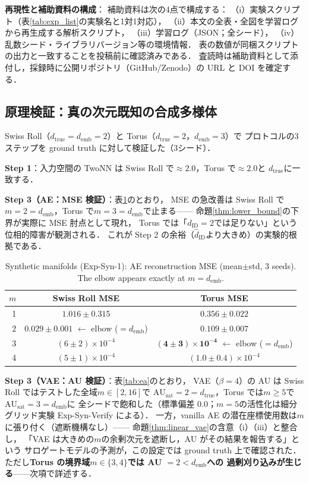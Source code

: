 \documentclass[11pt,a4paper]{jsarticle}
\newcommand{\dID}{d_{\mathrm{ID}}}
\newcommand{\hatdID}{\hat{d}_{\mathrm{ID}}}
\newcommand{\dtrue}{d_{\mathrm{true}}}
\newcommand{\AUsat}{\mathrm{AU}_{\mathrm{sat}}}
\newcommand{\demb}{d_{\mathrm{emb}}}
\begin{document}
\textbf{再現性と補助資料の構成}：
補助資料は次の4点で構成する：
（i）実験スクリプト（表\ref{tab:exp_list}の実験名と1対1対応），
（ii）本文の全表・全図を学習ログから再生成する解析スクリプト，
（iii）学習ログ（JSON；全シード），
（iv）乱数シード・ライブラリバージョン等の環境情報．
表の数値が同梱スクリプトの出力と一致することを投稿前に確認済みである．
査読時は補助資料として添付し，採録時に公開リポジトリ（GitHub/Zenodo）の
URL と DOI を確定する．

\subsection{原理検証：真の次元既知の合成多様体}\label{sec:exp_syn}

Swiss Roll（$\dtrue = \demb = 2$）と Torus（$\dtrue = 2$，$\demb = 3$）で
プロトコルの3ステップを ground truth に対して検証した（3シード）．

\textbf{Step 1}：入力空間の TwoNN は Swiss Roll で$\approx 2.0$，Torus で$\approx 2.0$と
$\dtrue$に一致する．

\textbf{Step 3（AE：MSE 検証）}：表\ref{tab:e1}のとおり，
MSE の急改善は Swiss Roll で$m = 2 = \demb$，Torus で$m = 3 = \demb$で止まる——
命題\ref{thm:lower_bound}の下界が実際に MSE 肘点として現れ，
Torus では「$\dID = 2$では足りない」という位相的障害が観測される．
これが Step 2 の余裕（$\hatdID$より大きめ）の実験的根拠である．

\begin{table}[H]
\centering
\caption{Synthetic manifolds (Exp-Syn-1): AE reconstruction MSE
(mean$\pm$std, 3 seeds). The elbow appears exactly at $m = \demb$.}
\label{tab:e1}
\small
\begin{tabular}{rcc}
\toprule
$m$ & Swiss Roll MSE & Torus MSE \\
\midrule
1 & $1.016 \pm 0.315$ & $0.356 \pm 0.022$ \\
2 & $\boldsymbol{0.029 \pm 0.001}$ $\leftarrow$ elbow ($= \demb$) & $0.109 \pm 0.007$ \\
3 & $(6 \pm 2) \times 10^{-4}$ & $\boldsymbol{(4 \pm 3) \times 10^{-4}}$ $\leftarrow$ elbow ($= \demb$) \\
4 & $(5 \pm 1) \times 10^{-4}$ & $(1.0 \pm 0.4) \times 10^{-4}$ \\
\bottomrule
\end{tabular}
\end{table}

\textbf{Step 3（VAE：AU 検証）}：表\ref{tab:ea}のとおり，
VAE（$\beta = 4$）の AU は Swiss Roll ではテストした全域$m \in [2, 16]$で
$\AUsat = 2 = \dtrue$，Torus では$m \geq 5$で$\AUsat = 3 = \demb$に
全シードで飽和した（標準偏差 0.0；$m = 5$の活性化は細分グリッド実験
Exp-Syn-Verify による）．
一方，vanilla AE の潜在座標使用数は$m$に張り付く（遮断機構なし）——
命題\ref{thm:linear_vae}の含意（i）（iii）と整合し，
「VAE は大きめの$m$の余剰次元を遮断し，AU がその結果を報告する」という
サロゲートモデルの予測が，この設定では ground truth 上で確認された．
ただし\textbf{Torus の境界域$m \in \{3, 4\}$では AU $= 2 < \demb$への
過剰刈り込みが生じる}——次項で詳述する．
\end{document}
